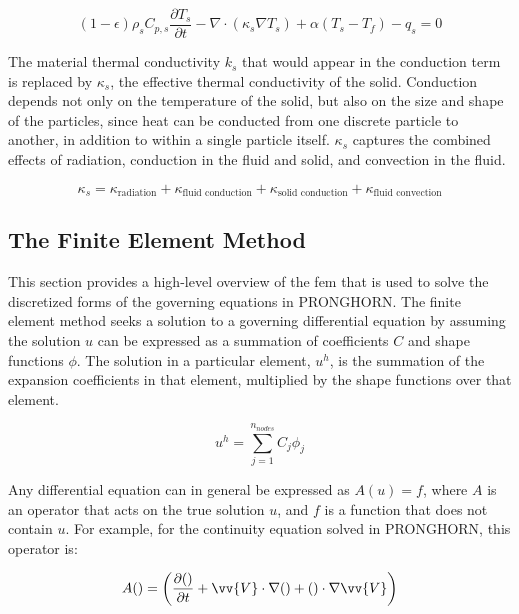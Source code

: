 \documentclass[10pt]{article}
\numberwithin{equation}{section} %
\begin{document}
\begin{equation}
\label{eq:SolidPorous}
(1-\epsilon)\rho_sC_{p,s}\frac{\partial T_s}{\partial t}-\nabla\cdot(\kappa_s\nabla T_s)+\alpha(T_s-T_f)-q_s=0
\end{equation}

The material thermal conductivity \(k_s\) that would appear in the conduction term is replaced by \(\kappa_s\), the effective thermal conductivity of the solid. Conduction depends not only on the temperature of the solid, but also on the size and shape of the particles, since heat can be conducted from one discrete particle to another, in addition to within a single particle itself. \(\kappa_s\) captures the combined effects of radiation, conduction in the fluid and solid, and convection in the fluid. 

\begin{equation}
\label{eq:Kappa}
\kappa_s=\kappa_{\textrm{radiation}}+\kappa_{\textrm{fluid conduction}}+\kappa_{\textrm{solid conduction}}+\kappa_{\textrm{fluid convection}}
\end{equation}

\subsection{The Finite Element Method}
\label{sec:FEM}

This section provides a high-level overview of the \gls{fem} that is used to solve the discretized forms of the governing equations in PRONGHORN. The finite element method seeks a solution to a governing differential equation by assuming the solution \(u\) can be expressed as a summation of coefficients \(C\) and shape functions \(\phi\). The solution in a particular element, \(u^h\), is the summation of the expansion coefficients in that element, multiplied by the shape functions over that element. 

\begin{equation}
\label{eq:FEExpansion}
u^h=\sum_{j=1}^{n_{nodes}} C_j\phi_j
\end{equation}

Any differential equation can in general be expressed as \(A(u)=f\), where \(A\) is an operator that acts on the true solution \(u\), and \(f\) is a function that does not contain \(u\). For example, for the continuity equation solved in PRONGHORN, this operator is:

\begin{equation}
A( )=\left(\frac{\partial( )}{\partial t}+\vv{V}\cdot\nabla( )+( )\cdot\nabla\vv{V}\right)
\end{equation}
\end{document}
